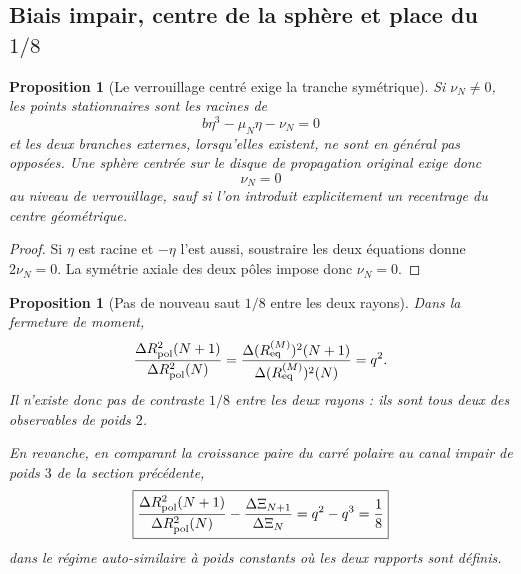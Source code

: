 \documentclass[11pt,a4paper]{article}
\newtheorem{proposition}[theorem]{Proposition}
\begin{document}
\subsection{Biais impair, centre de la sphère et place du $1/8$}

\begin{proposition}[Le verrouillage centré exige la tranche symétrique]\label{prop:v8-centered-sphere}
Si $\nu_N\neq0$, les points stationnaires sont les racines de
\[
 b\eta^3-\mu_N\eta-\nu_N=0
\]
et les deux branches externes, lorsqu'elles existent, ne sont en général pas opposées. Une sphère centrée sur le disque de propagation original exige donc
\[
 \boxed{\nu_N=0}
\]
au niveau de verrouillage, sauf si l'on introduit explicitement un recentrage du centre géométrique.
\end{proposition}

\begin{proof}
Si $\eta$ est racine et $-\eta$ l'est aussi, soustraire les deux équations donne $2\nu_N=0$. La symétrie axiale des deux pôles impose donc $\nu_N=0$.
\end{proof}

\begin{proposition}[Pas de nouveau saut $1/8$ entre les deux rayons]\label{prop:v8-no-new-eighth}
Dans la fermeture de moment,
\[
 \frac{\Delta R_{\rm pol}^2(N+1)}
 {\Delta R_{\rm pol}^2(N)}
 =
 \frac{\Delta (R_{\rm eq}^{(M)})^2(N+1)}
 {\Delta (R_{\rm eq}^{(M)})^2(N)}
 =q^2.
\]
Il n'existe donc pas de contraste $1/8$ entre les deux rayons : ils sont tous deux des observables de poids $2$.

En revanche, en comparant la croissance paire du carré polaire au canal impair de poids $3$ de la section précédente,
\begin{equation}\label{eq:v8-eighth-survives}
 \boxed{
 \frac{\Delta R_{\rm pol}^2(N+1)}
 {\Delta R_{\rm pol}^2(N)}
 -
 \frac{\Delta\Xi_{N+1}}{\Delta\Xi_N}
 =q^2-q^3=\frac18}
\end{equation}
dans le régime auto-similaire à poids constants où les deux rapports sont définis.
\end{proposition}
\end{document}

